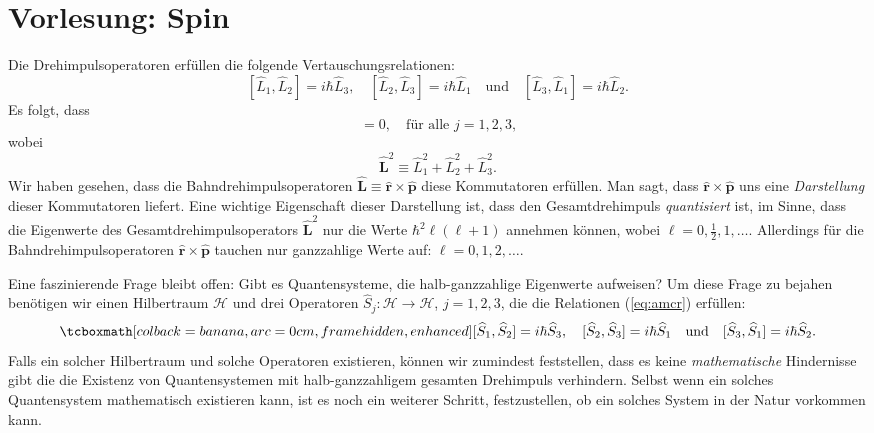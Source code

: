 
\section{Vorlesung: Spin}
Die Drehimpulsoperatoren erfüllen die folgende Vertauschungsrelationen:
\begin{equation}\label{eq:amcr}
	[\widehat{L}_1,\widehat{L}_2] = i\hbar \widehat{L}_3, \quad [\widehat{L}_2,\widehat{L}_3] = i\hbar \widehat{L}_1\quad\text{und}\quad [\widehat{L}_3,\widehat{L}_1] = i\hbar \widehat{L}_2.
\end{equation}
Es folgt, dass
\begin{equation}
	[\widehat{\mathbf{L}}^2, \widehat{L}_j]=0, \quad \text{für alle $j=1,2,3$,}
\end{equation}
wobei
\begin{equation}
	\widehat{\mathbf{L}}^2 \equiv \widehat{L}_1^2+\widehat{L}_2^2+\widehat{L}_3^2.
\end{equation}
Wir haben gesehen, dass die Bahndrehimpulsoperatoren $\widehat{\mathbf{L}} \equiv \widehat{\mathbf{r}}\times \widehat{\mathbf{p}}$ diese Kommutatoren erfüllen. Man sagt, dass $\widehat{\mathbf{r}}\times \widehat{\mathbf{p}}$ uns eine \emph{Darstellung} dieser Kommutatoren liefert. Eine wichtige Eigenschaft dieser Darstellung ist, dass den Gesamtdrehimpuls \emph{quantisiert} ist, im Sinne, dass die Eigenwerte des Gesamtdrehimpulsoperators $\widehat{\mathbf{L}}^2$ nur die Werte $\hbar^2 \ell(\ell+1)$ annehmen können, wobei $\ell = 0, \frac12, 1, \ldots$. Allerdings für die Bahndrehimpulsoperatoren $\widehat{\mathbf{r}}\times \widehat{\mathbf{p}}$ tauchen nur ganzzahlige Werte auf: $\ell = 0,1,2,\ldots$.

Eine faszinierende Frage bleibt offen: Gibt es Quantensysteme, die halb-ganzzahlige Eigenwerte aufweisen? Um diese Frage zu bejahen benötigen wir einen Hilbertraum $\mathcal{H}$ und drei Operatoren $\widehat{S}_j:\mathcal{H}\rightarrow \mathcal{H}$, $j=1,2,3$, die die Relationen (\ref{eq:amcr}) erfüllen:
\begin{equation}\label{eq:amcr}
	\eqbox{[\widehat{S}_1,\widehat{S}_2] = i\hbar \widehat{S}_3, \quad [\widehat{S}_2,\widehat{S}_3] = i\hbar \widehat{S}_1\quad\text{und}\quad [\widehat{S}_3,\widehat{S}_1] = i\hbar \widehat{S}_2.}
\end{equation}
Falls ein solcher Hilbertraum und solche Operatoren existieren, können wir zumindest feststellen, dass es keine \emph{mathematische} Hindernisse gibt die die Existenz von Quantensystemen mit halb-ganzzahligem gesamten Drehimpuls verhindern. Selbst wenn ein solches Quantensystem mathematisch existieren kann, ist es noch ein weiterer Schritt, festzustellen, ob ein solches System in der Natur vorkommen kann.

